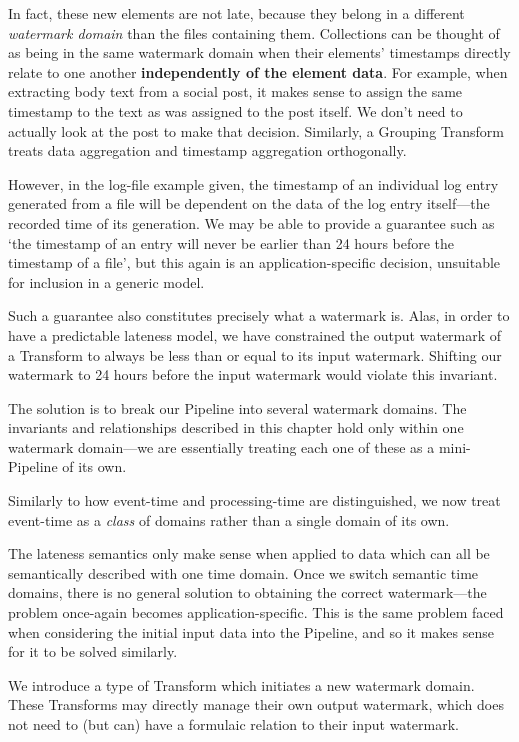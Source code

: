 In fact, these new elements are not late, because they belong in a different \emph{watermark domain} than the files containing them.
Collections can be thought of as being in the same watermark domain when their elements' timestamps directly relate to one another \textbf{independently of the element data}.
For example, when extracting body text from a social post, it makes sense to assign the same timestamp to the text as was assigned to the post itself.
We don't need to actually look at the post to make that decision.
Similarly, a Grouping Transform treats data aggregation and timestamp aggregation orthogonally.


However, in the log-file example given, the timestamp of an individual log entry generated from a file will be dependent on the data of the log entry itself---the recorded time of its generation.
We may be able to provide a guarantee such as `the timestamp of an entry will never be earlier than 24 hours before the timestamp of a file', but this again is an application-specific decision, unsuitable for inclusion in a generic model.

Such a guarantee also constitutes precisely what a watermark is.
Alas, in order to have a predictable lateness model, we have constrained the output watermark of a Transform to always be less than or equal to its input watermark.
Shifting our watermark to 24 hours before the input watermark would violate this invariant.

The solution is to break our Pipeline into several watermark domains.
The invariants and relationships described in this chapter hold only within one watermark domain---we are essentially treating each one of these as a mini-Pipeline of its own.

Similarly to how event-time and processing-time are distinguished, we now treat event-time as a \emph{class} of domains rather than a single domain of its own.

The lateness semantics only make sense when applied to data which can all be semantically described with one time domain.
Once we switch semantic time domains, there is no general solution to obtaining the correct watermark---the problem once-again becomes application-specific.
This is the same problem faced when considering the initial input data into the Pipeline, and so it makes sense for it to be solved similarly.

We introduce a type of Transform which initiates a new watermark domain.
These Transforms may directly manage their own output watermark, which does not need to (but can) have a formulaic relation to their input watermark.

